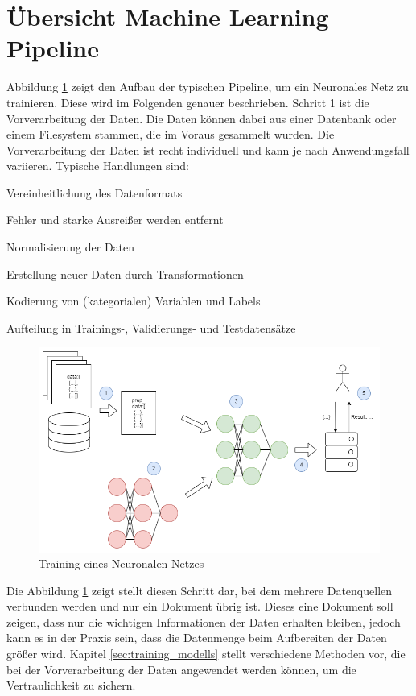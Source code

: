 \section{Übersicht Machine Learning Pipeline}


Abbildung \ref{fig:ml_pipeline} zeigt den Aufbau der typischen Pipeline, um ein Neuronales Netz zu trainieren. 
Diese wird im Folgenden genauer beschrieben.
Schritt 1 ist die Vorverarbeitung der Daten.
Die Daten können dabei aus einer Datenbank oder einem Filesystem stammen, die im Voraus gesammelt wurden.
Die Vorverarbeitung der Daten ist recht individuell und kann je nach Anwendungsfall variieren. 
Typische Handlungen sind:
\begin{compactitem}
\item Vereinheitlichung des Datenformats
\item Fehler und starke Ausreißer werden entfernt
\item Normalisierung der Daten
\item Erstellung neuer Daten durch Transformationen
\item Kodierung von (kategorialen) Variablen und Labels
\item Aufteilung in Trainings-, Validierungs- und Testdatensätze
\end{compactitem}
\begin{figure}[!htb]
    \centering
    \includegraphics[width=14cm]{figures/ml_pipeline.png}
    \caption{Training eines Neuronalen Netzes}
    \label{fig:ml_pipeline}
\end{figure} 

Die Abbildung \ref{fig:ml_pipeline} zeigt stellt diesen Schritt dar, bei dem mehrere Datenquellen verbunden werden und nur ein Dokument übrig ist. 
Dieses eine Dokument soll zeigen, dass nur die wichtigen Informationen der Daten erhalten bleiben, jedoch kann es in der Praxis sein, dass die Datenmenge beim Aufbereiten der Daten größer wird. 
Kapitel \ref{sec:training_modells} stellt verschiedene Methoden vor, die bei der Vorverarbeitung der Daten angewendet werden können, um die Vertraulichkeit zu sichern.

